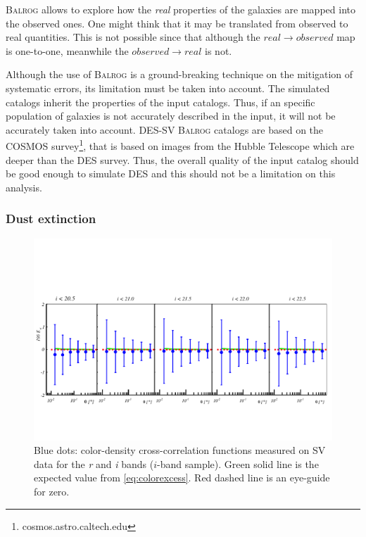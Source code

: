 {\scshape Balrog} allows to explore how the {\it real} properties of the galaxies are mapped into the observed ones. One might think that it may be translated from observed to real quantities. This is not possible since that although the $real\rightarrow observed$ map is one-to-one, meanwhile the $observed\rightarrow real$ is not.
\newline

Although the use of {\scshape Balrog} is a ground-breaking technique on the mitigation of systematic errors, its limitation must be taken into account. The simulated catalogs inherit the properties of the input catalogs. Thus, if an specific population of galaxies is not accurately described in the input, it will not be accurately taken into account. DES-SV {\scshape Balrog} catalogs are based on the {\scshape COSMOS} survey\footnote{cosmos.astro.caltech.edu}, that is based on images from the Hubble Telescope which are deeper than the DES survey. Thus, the overall quality of the input catalog should be good enough to simulate DES and this should not be a limitation on this analysis.

\subsubsection{Dust extinction}
\label{sec:dustext}

\begin{figure}
\includegraphics[width=\textwidth,trim={0 2.3cm 0 3.5cm},clip]{./figures/mag_i_ri.pdf}
\caption{Blue dots: color-density cross-correlation functions measured on SV data for the {\it r} and {\it i} bands ($i$-band sample). Green solid line is the expected value from \autoref{eq:colorexcess}. Red dashed line is an eye-guide for zero.}
\label{fig:colorexcess}
\end{figure}

